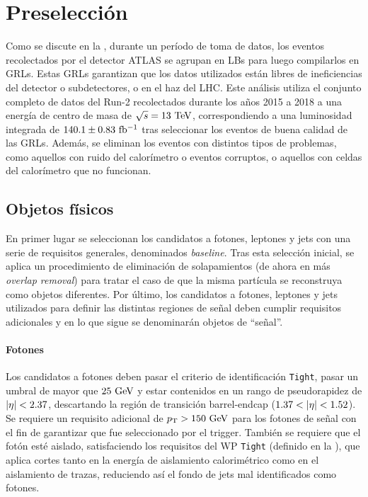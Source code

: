 \section{Preselección}
\label{sec:evt_selection:presel}



Como se discute en la \Sect{\ref{sec:atlas:runs}}, durante un período de toma de datos, los eventos recolectados por el detector \ac{ATLAS} se agrupan en \acp{LB} para luego compilarlos en \acp{GRL}. Estas \acp{GRL} garantizan que los datos utilizados están libres de ineficiencias del detector o subdetectores, o en el haz del \ac{LHC}. Este análisis utiliza el conjunto completo de datos del Run-2 recolectados durante los años 2015 a 2018 a una energ\'ia de centro de masa de \(\sqs = 13~\tev\), correspondiendo a una luminosidad integrada de \(140.1 \pm 0.83~\ifb\) tras seleccionar los eventos de buena calidad de las \acp{GRL}. Además, se eliminan los eventos con distintos tipos de problemas, como aquellos con ruido del calorímetro o eventos corruptos, o aquellos con celdas del calorímetro que no funcionan.





\subsection{Objetos f\'isicos}
\label{subsec:evt_selection:presel:objs}

En primer lugar se seleccionan los candidatos a fotones, leptones y jets con una serie de requisitos generales, denominados \textit{baseline}. Tras esta selección inicial, se aplica un procedimiento de eliminación de solapamientos (de ahora en más \textit{overlap removal}) para tratar el caso de que la misma partícula se reconstruya como objetos diferentes. Por último, los candidatos a fotones, leptones y jets utilizados para definir las distintas regiones de señal deben cumplir requisitos adicionales y en lo que sigue se denominarán objetos de \enquote{señal}.


\paragraph{Fotones}

Los candidatos a fotones deben pasar el criterio de identificación \texttt{Tight}, pasar un umbral de  \pt mayor que \(25~\GeV\) y estar contenidos en un rango de pseudorapidez de \(\abseta < 2.37\), descartando la región de transición barrel-endcap (\(1.37 < \abseta < 1.52\)). Se requiere un requisito adicional de \(\pt > 150~\GeV\) para los fotones de señal con el fin de garantizar que fue seleccionado por el trigger. También se requiere que el fotón esté aislado, satisfaciendo los requisitos del \ac{WP} \texttt{Tight} (definido en la \Sect{\ref{subsec:objects:egamma:iso}}), que aplica cortes tanto en la energía de aislamiento calorimétrico como en el aislamiento de trazas, reduciendo así el fondo de jets mal identificados como fotones.


